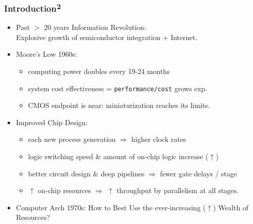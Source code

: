 \documentclass{beamer}
\renewcommand{\emph}[1]{\textcolor{structure}{#1}}
\newcommand{\emp}[1]{\textcolor{DikuRed}{ #1}}
\begin{document}
\begin{frame}[fragile,t]
\frametitle{Introduction$^{\mbox{\bf 2}}$}

\begin{itemize}
    \item Past $>$ 20 years \emph{Information Revolution}:\\
        Explosive growth of semiconductor integration + Internet.\bigskip

    \item Moore's Low 1960s: 
    \begin{itemize}
        \item computing power doubles every 19-24 months 
        \item \emph{system cost effectiveness = {\tt performance/cost} 
                grows exp}.
        \item \alert{CMOS endpoint is near}: miniaturization reaches its limits.   
    \end  {itemize}\bigskip

    \item Improved Chip Design:
    \begin{itemize}
        \item each new process generation $\Rightarrow$ higher clock rates 
        \item logic switching speed \& amount of on-chip logic increase ($\uparrow$)
        \item better circuit design \& deep pipelines $\Rightarrow$ 
                fewer gate delays / stage
        \item $\uparrow$ on-chip resources $\Rightarrow$ $\uparrow$ throughput by 
                parallelism at all stages. 
    \end  {itemize}\bigskip

    \item \emp{Computer Arch 1970s: How to Best Use the ever-increasing ($\uparrow$) 
            Wealth of Resources?}

\end{itemize}

\end{frame}
\end{document}
